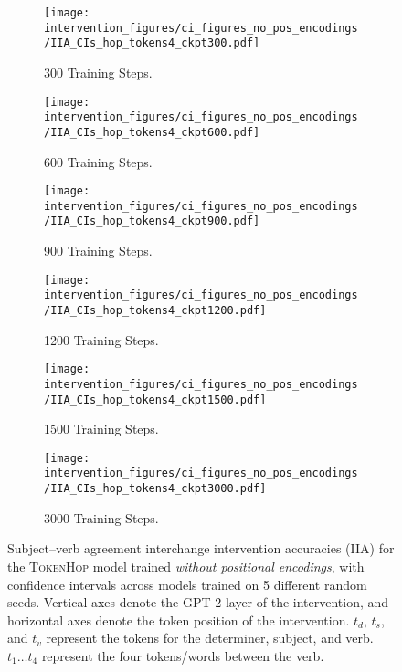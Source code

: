 \documentclass[11pt]{article}
\begin{document}
\begin{figure*}
    \centering
     \begin{subfigure}{0.49\textwidth}
         \centering
         \texttt{[image: intervention\_figures/ci\_figures\_no\_pos\_encodings/IIA\_CIs\_hop\_tokens4\_ckpt300.pdf]}
         \caption{300 Training Steps.}
     \end{subfigure}
     \begin{subfigure}{0.49\textwidth}
         \centering
         \texttt{[image: intervention\_figures/ci\_figures\_no\_pos\_encodings/IIA\_CIs\_hop\_tokens4\_ckpt600.pdf]}
         \caption{600 Training Steps.}
     \end{subfigure}
     \begin{subfigure}{0.49\textwidth}
         \centering
         \texttt{[image: intervention\_figures/ci\_figures\_no\_pos\_encodings/IIA\_CIs\_hop\_tokens4\_ckpt900.pdf]}
         \caption{900 Training Steps.}
     \end{subfigure}
     \begin{subfigure}{0.49\textwidth}
         \centering
         \texttt{[image: intervention\_figures/ci\_figures\_no\_pos\_encodings/IIA\_CIs\_hop\_tokens4\_ckpt1200.pdf]}
         \caption{1200 Training Steps.}
     \end{subfigure}
     \begin{subfigure}{0.49\textwidth}
         \centering
         \texttt{[image: intervention\_figures/ci\_figures\_no\_pos\_encodings/IIA\_CIs\_hop\_tokens4\_ckpt1500.pdf]}
         \caption{1500 Training Steps.}
     \end{subfigure}
     \begin{subfigure}{0.49\textwidth}
         \centering
         \texttt{[image: intervention\_figures/ci\_figures\_no\_pos\_encodings/IIA\_CIs\_hop\_tokens4\_ckpt3000.pdf]}
         \caption{3000 Training Steps.}
     \end{subfigure}
    \caption{Subject--verb agreement interchange intervention accuracies (IIA) for the \textsc{TokenHop} model trained \emph{without positional encodings}, with confidence intervals across models trained on 5 different random seeds. Vertical axes denote the GPT-2 layer of the intervention, and horizontal axes denote the token position of the intervention. $t_d$, $t_s$, and $t_v$ represent the tokens for the determiner, subject, and verb. $t_1 \dots t_4$ represent the four tokens/words between the verb.}
    \label{fig:iia_ci_hop_tokens4_no_pos_encodings}
\end{figure*}
\end{document}
